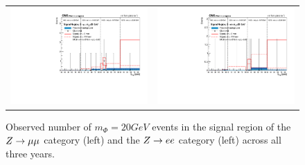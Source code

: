 \begin{figure}[htb!]
\begin{tabular}{c c}
		\includegraphics[width=0.45\linewidth]{figs/05_analysis/closure_ZH_MU_m20_data_2016.pdf} &
		\includegraphics[width=0.45\linewidth]{figs/05_analysis/closure_ZH_ELE_m20_data_2016.pdf} \\
	\end{tabular}
	\caption[Observed number of $m_\Phi=20\unit{GeV}$ events in the signal region of the $\VZ\to\mu\mu$ category (left) and the $\VZ\to ee$ category (left) across all three years.]{Observed number of $m_\Phi=20\unit{GeV}$ events in the signal region of the $\VZ\to\mu\mu$ category (left) and the $\VZ\to ee$ category (left) across all three years.}
	\label{fig:results_m20}
\end{figure}

